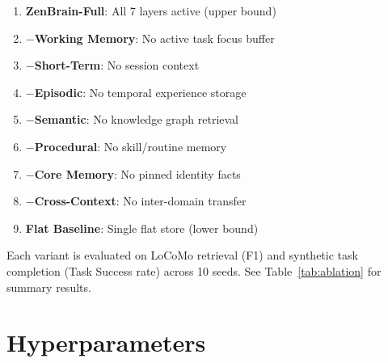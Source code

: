 \documentclass{article}
\begin{document}
\begin{enumerate}
    \item \textbf{ZenBrain-Full}: All 7 layers active (upper bound)
    \item \textbf{$-$Working Memory}: No active task focus buffer
    \item \textbf{$-$Short-Term}: No session context
    \item \textbf{$-$Episodic}: No temporal experience storage
    \item \textbf{$-$Semantic}: No knowledge graph retrieval
    \item \textbf{$-$Procedural}: No skill/routine memory
    \item \textbf{$-$Core Memory}: No pinned identity facts
    \item \textbf{$-$Cross-Context}: No inter-domain transfer
    \item \textbf{Flat Baseline}: Single flat store (lower bound)
\end{enumerate}

Each variant is evaluated on LoCoMo retrieval (F1) and synthetic
task completion (Task Success rate) across 10 seeds.
See Table~\ref{tab:ablation} for summary results.

\section{Hyperparameters}
\label{app:hyperparams}
\end{document}
